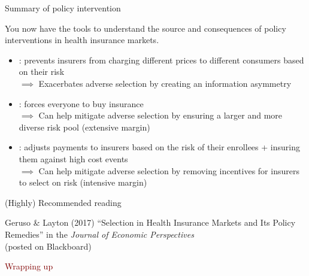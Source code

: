\begin{frame}{Summary of policy intervention}

    You now have the tools to understand the source and consequences of policy interventions in health insurance markets.\\
    \vspace{3mm}
    \pause

    \begin{itemize}
        \item {}: prevents insurers from charging different prices to different consumers based on their risk\\
        \pause
        $\implies$ Exacerbates adverse selection by creating an information asymmetry
        \item {}: forces everyone to buy insurance\\
        \pause
        $\implies$ Can help mitigate adverse selection by ensuring a larger and more diverse risk pool (extensive margin)
        \pause
        \item {}: adjusts payments to insurers based on the risk of their enrollees + insuring them against high cost events\\
        \pause
        $\implies$ Can help mitigate adverse selection by removing incentives for insurers to select on risk (intensive margin)
    \end{itemize}
 
\end{frame}
\begin{frame}{(Highly) Recommended reading}

    Geruso \& Layton (2017) ``Selection in Health Insurance Markets and Its Policy Remedies''
    in the \textit{Journal of Economic Perspectives}\\
    (posted on Blackboard)

    
 
\end{frame}
\begin{frame}{}
    \begin{center}
    \Large \textcolor{maroon}{Wrapping up}
    \end{center}
\end{frame}
